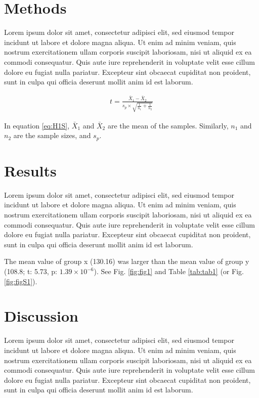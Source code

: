 \documentclass[
  12pt,
]{article}
\begin{document}
\hypertarget{methods}{%
\section{Methods}\label{methods}}

Lorem ipsum dolor sit amet, consectetur adipisci elit, sed eiusmod tempor incidunt ut labore et dolore magna aliqua. Ut enim ad minim veniam, quis nostrum exercitationem ullam corporis suscipit laboriosam, nisi ut aliquid ex ea commodi consequatur. Quis aute iure reprehenderit in voluptate velit esse cillum dolore eu fugiat nulla pariatur. Excepteur sint obcaecat cupiditat non proident, sunt in culpa qui officia deserunt mollit anim id est laborum.

\begin{align}
t = \frac{\bar{X}_{1} - \bar{X}_{2}} {s_{p} \times \sqrt{\frac{1}{n_{1}} + \frac{1}{n_{2}}}} \label{eq:H1S}
\end{align}

In equation \eqref{eq:H1S}, \(\bar{X}_{1}\) and \(\bar{X}_{2}\) are the mean of the samples. Similarly, \(n_{1}\) and \(n_{2}\) are the sample sizes, and \(s_{p}\).

\hypertarget{results}{%
\section{Results}\label{results}}

Lorem ipsum dolor sit amet, consectetur adipisci elit, sed eiusmod tempor incidunt ut labore et dolore magna aliqua. Ut enim ad minim veniam, quis nostrum exercitationem ullam corporis suscipit laboriosam, nisi ut aliquid ex ea commodi consequatur. Quis aute iure reprehenderit in voluptate velit esse cillum dolore eu fugiat nulla pariatur. Excepteur sint obcaecat cupiditat non proident, sunt in culpa qui officia deserunt mollit anim id est laborum.

The mean value of group x (130.16) was larger than the mean value of group y (108.8; t: 5.73, p: \ensuremath{1.39\times 10^{-6}}). See Fig. \ref{fig:fig1} and Table \ref{tab:tab1} (or Fig. \ref{fig:figS1}).

\hypertarget{discussion}{%
\section{Discussion}\label{discussion}}

Lorem ipsum dolor sit amet, consectetur adipisci elit, sed eiusmod tempor incidunt ut labore et dolore magna aliqua. Ut enim ad minim veniam, quis nostrum exercitationem ullam corporis suscipit laboriosam, nisi ut aliquid ex ea commodi consequatur. Quis aute iure reprehenderit in voluptate velit esse cillum dolore eu fugiat nulla pariatur. Excepteur sint obcaecat cupiditat non proident, sunt in culpa qui officia deserunt mollit anim id est laborum.
\end{document}
